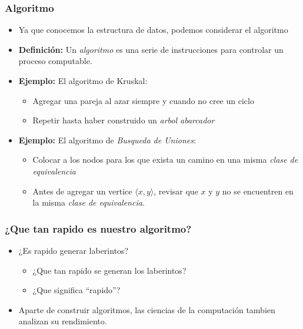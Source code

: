 \documentclass{beamer}
\begin{document}
\begin{frame}
\frametitle{Algoritmo}
\begin{itemize}
\item{Ya que conocemos la estructura de datos, podemos considerar el algoritmo}
\item{{\bf Definici\'on:} Un \emph{algoritmo} es una serie de instrucciones para
controlar un proceso computable.}
\item{{\bf Ejemplo: } El algoritmo de Kruskal:
\begin{itemize}
    \item{Agregar una pareja al azar siempre y cuando no cree un ciclo}
    \item{Repetir hasta haber construido un \emph{arbol abarcador}}
\end{itemize}
}
\item{{\bf Ejemplo: } El algoritmo de \emph{Busqueda de Uniones}:
    \begin{itemize}
        \item{Colocar a los nodos para los que exista un camino en
        una misma \emph{clase de equivalencia}}
        \item{Antes de agregar un vertice $\langle x,y \rangle$, revisar
        que $x$ y $y$ no se encuentren en la misma \emph{clase de equivalencia}.}
    \end{itemize}
}
\end{itemize}
\end{frame}

\begin{frame}
\frametitle{¿Que tan rapido es nuestro algoritmo?}
\begin{itemize}
\item{¿Es rapido generar laberintos?
    \begin{itemize}
        \item{¿Que tan rapido se generan los laberintos?}
        \item{¿Que significa ``rapido''?}
    \end{itemize}
}
\item{Aparte de construir algoritmos, las ciencias de la computaci\'on tambien analizan
su rendimiento.}
\end{itemize}
\end{frame}
\end{document}
